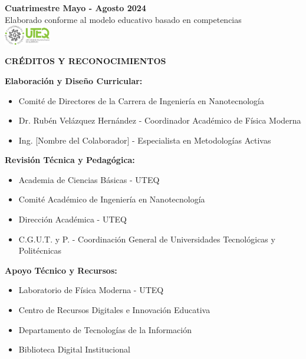 \documentclass[12pt,a4paper]{book}
\begin{document}
\begin{titlepage}
\begin{center}
			\vfill
			
			{\normalsize \textcolor{uteqgray}{\textbf{Cuatrimestre Mayo - Agosto 2024}}}\\[0.5cm]
			{\small \textcolor{uteqgray}{Elaborado conforme al modelo educativo basado en competencias}}\\[1cm]
			
			\includegraphics[width=2cm]{../../Imagenes/Logo_uteq}
			
		\end{center}
	\end{titlepage}
	
	\thispagestyle{empty}
	\vspace*{1cm}
	
	\begin{center}
		\textbf{\Large CRÉDITOS Y RECONOCIMIENTOS}
	\end{center}
	
	\vspace{1cm}
	
	\textbf{Elaboración y Diseño Curricular:}
	\begin{itemize}[leftmargin=2cm]
		\item Comité de Directores de la Carrera de Ingeniería en Nanotecnología
		\item Dr. Rubén Velázquez Hernández - Coordinador Académico de Física Moderna
		\item Ing. [Nombre del Colaborador] - Especialista en Metodologías Activas
	\end{itemize}
	
	\textbf{Revisión Técnica y Pedagógica:}
	\begin{itemize}[leftmargin=2cm]
		\item Academia de Ciencias Básicas - UTEQ
		\item Comité Académico de Ingeniería en Nanotecnología
		\item Dirección Académica - UTEQ
		\item C.G.U.T. y P. - Coordinación General de Universidades Tecnológicas y Politécnicas
	\end{itemize}
	
	\textbf{Apoyo Técnico y Recursos:}
	\begin{itemize}[leftmargin=2cm]
		\item Laboratorio de Física Moderna - UTEQ
		\item Centro de Recursos Digitales e Innovación Educativa
		\item Departamento de Tecnologías de la Información
		\item Biblioteca Digital Institucional
	\end{itemize}
	
\end{document}
